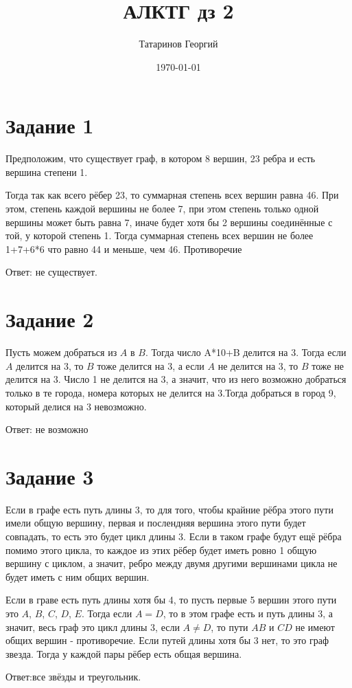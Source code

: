 \documentclass[a4paper, 12pt]{article}
\title{АЛКТГ дз 2}
\author{Татаринов Георгий}
\date{\today}
\begin{document}
	\maketitle
	\section*{Задание 1}
        Предположим, что существует граф, в котором 8 вершин, 23 ребра и есть вершина степени 1.\par
        Тогда так как всего рёбер 23, то суммарная степень всех вершин равна 46. При этом, степень каждой вершины не более 7, при этом степень только одной вершины может быть равна 7, иначе будет хотя бы 2 вершины соединённые с той, у которой степень 1. Тогда суммарная степень всех вершин не более 1+7+6*6 что равно 44 и меньше, чем 46. Противоречие\par
        Ответ: не существует.
	\section*{Задание 2}
		Пусть можем добраться из $A$ в $B$. Тогда число A*10+B делится на 3. Тогда если $A$ делится на 3, то $B$ тоже делится на 3, а если $A$ не делится на 3, то $B$ тоже не делится на 3. Число 1 не делится на 3, а значит, что из него возможно добраться только в те города, номера которых не делится на 3.Тогда добраться в город 9, который делися на 3 невозможно.\par
		Ответ: не возможно
	\section*{Задание 3}
        Если в графе есть путь длины 3, то для того, чтобы крайние рёбра этого пути имели общую вершину, первая и послендняя вершина этого пути будет совпадать, то есть это будет цикл длины 3. Если в таком графе будут ещё рёбра помимо этого цикла, то каждое из этих рёбер будет иметь ровно 1 общую вершину с циклом, а значит, ребро между двумя другими вершинами цикла не будет иметь с ним общих вершин.\par
        Если в граве есть путь длины хотя бы 4, то пусть первые 5 вершин этого пути это $A$, $B$, $C$, $D$, $E$. Тогда если $A=D$, то в этом графе есть и путь длины 3, а значит, весь граф это цикл длины 3, если $A\neq D$, то пути $AB$ и $CD$ не имеют общих вершин - противоречие.
        Если путей длины хотя бы 3 нет, то это граф звезда. Тогда у каждой пары рёбер есть общая вершина.\par
        Ответ:все звёзды и треугольник.
\end{document}

